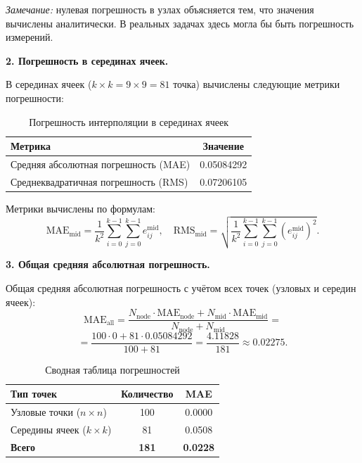 \documentclass[a4paper, 14pt]{extarticle}
\begin{document}
\textit{Замечание:} нулевая погрешность в узлах объясняется тем, что значения вычислены аналитически. В реальных задачах здесь могла бы быть погрешность измерений.

\textbf{2. Погрешность в серединах ячеек.}

В серединах ячеек ($k \times k = 9 \times 9 = 81$ точка) вычислены следующие метрики погрешности:

\begin{table}[H]
\centering
\begin{tabular}{|l|c|}
\hline
\textbf{Метрика} & \textbf{Значение} \\
\hline
Средняя абсолютная погрешность (MAE) & 0.05084292 \\
\hline
Среднеквадратичная погрешность (RMS) & 0.07206105 \\
\hline
\end{tabular}
\caption{Погрешность интерполяции в серединах ячеек}
\label{tab:error_midpoints}
\end{table}

Метрики вычислены по формулам:
\[
\text{MAE}_{\text{mid}} = \frac{1}{k^2} \sum_{i=0}^{k-1} \sum_{j=0}^{k-1} e^{\text{mid}}_{ij}, \quad \text{RMS}_{\text{mid}} = \sqrt{\frac{1}{k^2} \sum_{i=0}^{k-1} \sum_{j=0}^{k-1} \left(e^{\text{mid}}_{ij}\right)^2}.
\]

\textbf{3. Общая средняя абсолютная погрешность.}

Общая средняя абсолютная погрешность с учётом всех точек (узловых и середин ячеек):
\[
\text{MAE}_{\text{all}} = \frac{N_{\text{node}} \cdot \text{MAE}_{\text{node}} + N_{\text{mid}} \cdot \text{MAE}_{\text{mid}}}{N_{\text{node}} + N_{\text{mid}}} =
\]
\[
= \frac{100 \cdot 0 + 81 \cdot 0.05084292}{100 + 81} = \frac{4.11828}{181} \approx 0.02275.
\]

\begin{table}[H]
\centering
\begin{tabular}{|l|c|c|}
\hline
\textbf{Тип точек} & \textbf{Количество} & \textbf{MAE} \\
\hline
Узловые точки ($n \times n$) & 100 & 0.0000 \\
\hline
Середины ячеек ($k \times k$) & 81 & 0.0508 \\
\hline
\textbf{Всего} & \textbf{181} & \textbf{0.0228} \\
\hline
\end{tabular}
\caption{Сводная таблица погрешностей}
\label{tab:error_summary}
\end{table}
\end{document}

